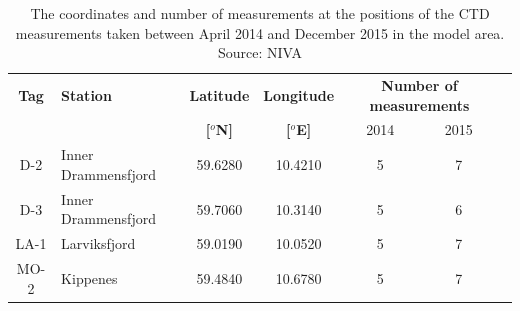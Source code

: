 \begin{table}
\caption{The coordinates and number of measurements at the positions of the CTD measurements taken between April 2014 and December 2015 in the model area. Source: NIVA} 
\label{tab:CTD_pos} 
\centering 
\begin{tabular}{|clcccc@{}c|} 
\hline  
{\bf Tag} & {\bf Station} & {\bf Latitude} & {\bf Longitude} & \multicolumn{2}{c}{\bf Number of measurements} &\\ 
&& {\bf [$^o$N]} & {\bf [$^o$E]} & 2014 & 2015 &\\ \hline
D-2 & Inner Drammensfjord & 59.6280 & 10.4210 & 5 & 7 &\\ 
D-3 & Inner Drammensfjord & 59.7060 & 10.3140 & 5 & 6 &\\ \hline
LA-1 & Larviksfjord & 59.0190 & 10.0520 & 5 & 7 &\\ 
MO-2 & Kippenes & 59.4840 & 10.6780 & 5 & 7 &\\ \hline

\end{tabular}
\end{table}

